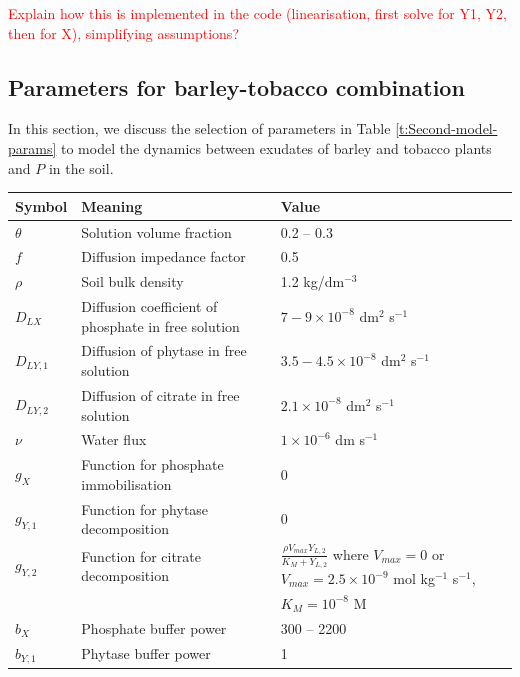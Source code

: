 \documentclass[11pt]{article}
\numberwithin{equation}{section}
\begin{document}
\textcolor{red}{Explain how this is implemented in the code (linearisation, first solve for Y1, Y2, then for X), simplifying assumptions?}


\subsection{Parameters for barley-tobacco combination}
In this section, we discuss the selection of parameters in Table \ref{t:Second-model-params} to model the dynamics between exudates of barley and tobacco plants and $P$ in the soil.

\begin{table}[!htb]
\begin{center}
\fontsize{9.5}{7}\selectfont
\setlength{\tabcolsep}{5.pt}
\def\arraystretch{2.0}
\begin{tabular}{lll}
\toprule
    \bf Symbol & \multicolumn{1}{l}{\bf Meaning} & \bf Value
    \\ \midrule
    $\theta$ & Solution volume fraction & 0.2 -- 0.3 \\
    $f$ & Diffusion impedance factor & 0.5 \\ 
    $\rho$ & Soil bulk density & 1.2 kg/dm$^{-3}$ \\
    $D_{LX} $ & Diffusion coefficient of phosphate in free solution & $7-9 \times 10^{-8}$ dm$^2$ s$^{-1}$ \\  
	$D_{LY,1}$ &  Diffusion of phytase in free solution & $3.5 - 4.5 \times 10^{-8}$ dm$^2$ s$^{-1}$ \\   
	$D_{LY,2}$ & Diffusion of citrate in free solution & $2.1 \times 10^{-8}$ dm$^2$ s$^{-1}$ \\
	$\nu$ & Water flux & $1 \times 10^{-6}$ dm s$^{-1}$\\
	$g_X$ & Function for phosphate immobilisation & 0 \\
	$g_{Y,1}$ & Function for phytase decomposition & 0 \\
	$g_{Y,2}$ & Function for citrate decomposition & $\frac{\rho V_{max} Y_{L,2} }{K_M + Y_{L,2} }$ where $V_{max} = 0$ or $V_{max} = 2.5 \times 10^{-9}$ mol kg$^{-1}$ s$^{-1}$, \\
	 & & $K_M=10^{-8}$ M \\
	$b_X$ & Phosphate buffer power & 300 -- 2200 \\
	$b_{Y,1}$ & Phytase buffer power & 1 \\

\end{tabular}
\end{center}
\end{table}
\end{document}
